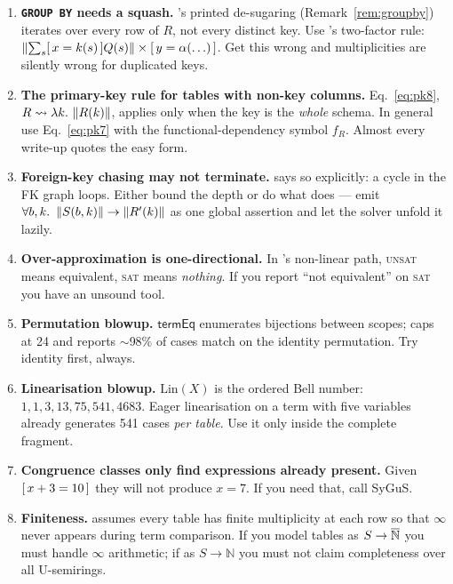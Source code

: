 \begin{enumerate}
\item \textbf{\lstinline|GROUP BY| needs a squash.} \udp{}'s printed de-sugaring
      (Remark~\ref{rem:groupby}) iterates over every row of $R$, not every distinct key. Use
      \QED{}'s two-factor rule: $\left\lVert \sum_{s}[\,x=k(s)\,]Q(s) \right\rVert\times[\,y=\alpha(\ldots)\,]$.
      Get this wrong and multiplicities are silently wrong for duplicated keys.

\item \textbf{The primary-key rule for tables with non-key columns.} Eq.~\eqref{eq:pk8},
      $R\rightsquigarrow\lambda k.\,\left\lVert R(k) \right\rVert$, applies only when the key is the \emph{whole}
      schema. In general use Eq.~\eqref{eq:pk7} with the functional-dependency symbol $f_R$.
      Almost every write-up quotes the easy form.

\item \textbf{Foreign-key chasing may not terminate.} \udp{} says so explicitly: a cycle in
      the FK graph loops. Either bound the depth or do what \QED{} does --- emit
      $\forall b,k.\ \sq{S(b,k)}\to\sq{R'(k)}$ as one global assertion and let the solver
      unfold it lazily.

\item \textbf{Over-approximation is one-directional.} In \sqlsolver{}'s non-linear path,
      \textsc{unsat} means equivalent, \textsc{sat} means \emph{nothing}. If you report
      ``not equivalent'' on \textsc{sat} you have an unsound tool.

\item \textbf{Permutation blowup.} $\textsf{termEq}$ enumerates bijections between scopes;
      \QED{} caps at 24 and reports $\sim$98\% of cases match on the identity permutation.
      Try identity first, always.

\item \textbf{Linearisation blowup.} $\mathrm{Lin}(X)$ is the ordered Bell number:
      $1,1,3,13,75,541,4683$. Eager linearisation on a term with five variables already
      generates 541 cases \emph{per table}. Use it only inside the complete fragment.

\item \textbf{Congruence classes only find expressions already present.} Given
      $[\,x+3=10\,]$ they will not produce $x=7$. If you need that, call SyGuS.

\item \textbf{Finiteness.} \QED{} assumes every table has finite multiplicity at each row so
      that $\infty$ never appears during term comparison. If you model tables as
      $S\to\overline{\mathbb{N}}$ you must handle $\infty$ arithmetic; if as $S\to\mathbb{N}$ you must not
      claim completeness over all U-semirings.


\end{enumerate}
